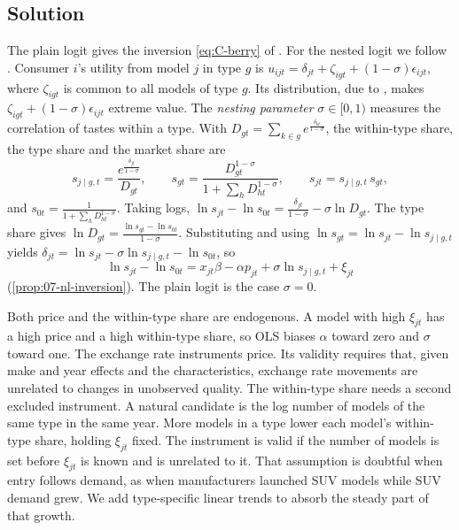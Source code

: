 \subsection{Solution}

The plain logit gives the inversion \eqref{eq:C-berry} of \citet[eq.~14]{Berry1994}. For the nested logit we follow
\citet[eqs.~22--28, pp.~252--253]{Berry1994}. Consumer $i$'s utility from model $j$ in type $g$ is
$u_{ijt} = \delta_{jt} + \zeta_{igt} + (1 - \sigma)\epsilon_{ijt}$, where $\zeta_{igt}$ is common to all models of type
$g$. Its distribution, due to \citet{Cardell1997}, makes $\zeta_{igt} + (1 - \sigma)\epsilon_{ijt}$ extreme value. The
\emph{nesting parameter} $\sigma \in [0, 1)$ measures the correlation of tastes within a type. With
$D_{gt} = \sum_{k \in g}e^{\frac{\delta_{kt}}{1 - \sigma}}$, the within-type share, the type share and the market share
are
\begin{equation}\label{eq:C-nl-shares}
  s_{j\mid g,t} = \frac{e^{\frac{\delta_{jt}}{1 - \sigma}}}{D_{gt}} , \qquad
  s_{gt} = \frac{D_{gt}^{1 - \sigma}}{1 + \sum_hD_{ht}^{1 - \sigma}} , \qquad
  s_{jt} = s_{j\mid g,t}\,s_{gt} ,
\end{equation}
and $s_{0t} = \frac{1}{1 + \sum_hD_{ht}^{1 - \sigma}}$. Taking logs,
$\ln s_{jt} - \ln s_{0t} = \frac{\delta_{jt}}{1 - \sigma} - \sigma\ln D_{gt}$. The type share gives
$\ln D_{gt} = \frac{\ln s_{gt} - \ln s_{0t}}{1 - \sigma}$. Substituting and using $\ln s_{gt} = \ln s_{jt} - \ln
s_{j\mid g,t}$ yields $\delta_{jt} = \ln s_{jt} - \sigma\ln s_{j\mid g,t} - \ln s_{0t}$, so
\begin{equation}\label{eq:C-nl-reg}
  \ln s_{jt} - \ln s_{0t} = x_{jt}\beta - \alpha p_{jt} + \sigma\ln s_{j\mid g,t} + \xi_{jt}
\end{equation}
(\cref{prop:07-nl-inversion}). The plain logit is the case $\sigma = 0$.

Both price and the within-type share are endogenous. A model with high $\xi_{jt}$ has a high price and a high
within-type share, so OLS biases $\alpha$ toward zero and $\sigma$ toward one. The exchange rate instruments price. Its
validity requires that, given make and year effects and the characteristics, exchange rate movements are unrelated to
changes in unobserved quality. The within-type share needs a second excluded instrument. A natural candidate is the log
number of models of the same type in the same year. More models in a type lower each model's within-type share, holding
$\xi_{jt}$ fixed. The instrument is valid if the number of models is set before $\xi_{jt}$ is known and is unrelated to
it. That assumption is doubtful when entry follows demand, as when manufacturers launched SUV models while SUV demand
grew. We add type-specific linear trends to absorb the steady part of that growth.


